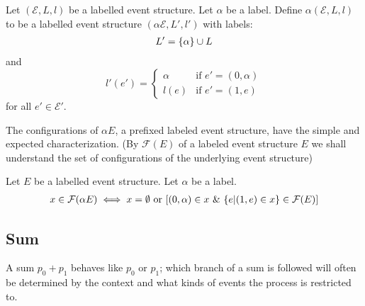 \documentclass{article}
\begin{document}
\begin{definition}
Let $(\mathcal{E},L,l)$ be a labelled event structure.
Let $\alpha$ be a label.
Define $\alpha(\mathcal{E},L,l)$ to be a labelled event structure $(\alpha \mathcal{E},L',l')$
with labels:
\begin{align*}
        L' = \{\alpha\} \cup L
\end{align*}
and
$$
    l'(e') = \begin{cases}
        \alpha & \text{if } e' = (0,\alpha) \\
        l(e) & \text{if } e' = (1,e)
    \end{cases}
$$
for all $e' \in \mathcal{E'}$.
\end{definition}
The configurations of $\alpha E$, a prefixed labeled event structure,
have the simple and expected characterization.
(By $\mathcal{F}(E)$ of a labeled event structure $E$ we shall understand the set
of configurations of the underlying event structure)

\begin{proposition}

Let $E$ be a labelled event structure. Let $\alpha$ be a label.
\begin{align*}
    x \in \mathcal{F}(\alpha E) \iff x = \emptyset \text{ or }
    [(0,\alpha)\in x \ \& \  \{e | (1,e)\in x\} \in \mathcal{F}(E)]
\end{align*}

\end{proposition}

\subsection{Sum}
A sum $p_0 + p_1$ behaves like $p_0$ or $p_1$; which branch of a sum is followed will
often be determined by the context and what kinds of events the process is restricted to.
\end{document}
